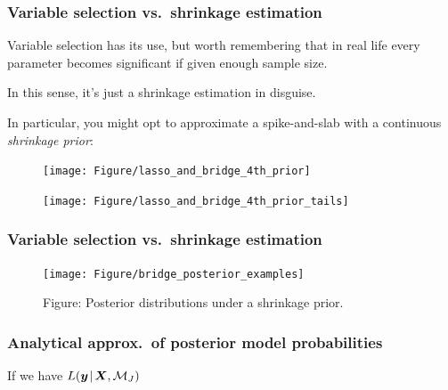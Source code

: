 \documentclass[18pt, handout]{beamer}
\newcommand{\given}{\mskip.7\thinmuskip | \mskip.7\thinmuskip}
\newcommand{\likelihood}{L}
\newcommand{\by}{\bm{y}}
\newcommand{\bX}{\bm{X}}
\newcommand{\model}{\mathcal{M}}
\newcommand{\nonzeroCoefSet}{J}
\begin{document}
\begin{frame}
\frametitle{Variable selection vs.\ shrinkage estimation}

Variable selection has its use, but worth remembering that in real life every parameter becomes significant if given enough sample size.

In this sense, it's just a shrinkage estimation in disguise. 

In particular, you might opt to approximate a spike-and-slab with a continuous \textit{shrinkage prior}:

\vspace{-.3\baselineskip}
	\begin{figure}
		\begin{minipage}{.48\linewidth}
		\texttt{[image: Figure/lasso\_and\_bridge\_4th\_prior]}
		\end{minipage}
		\begin{minipage}{.48\linewidth}
			\texttt{[image: Figure/lasso\_and\_bridge\_4th\_prior\_tails]}
		\end{minipage}
	\end{figure} \vspace{-.3\baselineskip}

\end{frame}


\begin{frame}
\frametitle{Variable selection vs.\ shrinkage estimation}
\begin{figure}
\texttt{[image: Figure/bridge\_posterior\_examples]}
\caption*{\textcolor{themecolor}{Figure:}
	Posterior distributions under a shrinkage prior.
}
\end{figure}
\end{frame}


\begin{frame}
\frametitle{Analytical approx.\ of posterior model probabilities}
If we have
$\likelihood(\by \given \bX,  \model_\nonzeroCoefSet)$
\end{frame}

\end{document}

